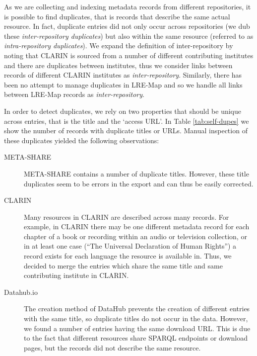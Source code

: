 \documentclass[11pt]{article}
\begin{document}
As we are collecting and indexing metadata records from different repositories,
it is possible to find duplicates, that is records that describe the same actual
resource.
In fact, duplicate entries did not only occur across repositories
(we dub these \emph{inter-repository duplicates}) but also within the same
resource (referred to as \emph{intra-repository duplicates}). 
We expand the
definition of inter-repository by noting that CLARIN 
is sourced from a number of different contributing institutes and there are
duplicates between institutes, thus we consider links between records
of different CLARIN institutes as \emph{inter-repository}. Similarly, there has
been no attempt to manage duplicates in LRE-Map and so we handle all links
between LRE-Map records as \emph{inter-repository}.

In order to detect duplicates, we rely on two properties
that should be unique across entries, that is the title and the `access URL'.
In Table
\ref{tab:self-dupes} we show the number of records with duplicate titles or URLs.
Manual inspection of these duplicates yielded the following
observations:

\begin{description}

	\item[META-SHARE] META-SHARE contains a number of duplicate titles.
            However, these title duplicates seem to be errors in the export and can thus be easily corrected. 

    \item[CLARIN] Many resources in CLARIN are described across many records.
        For example, in CLARIN there may be one different metadata record for each chapter of a book or
        recording within an audio or television collection, or in at least one case
        (``The Universal Declaration of Human Rights'') a record exists for each
        language the resource is available in. Thus, we decided to merge the entries which
        share the same title and same contributing institute in CLARIN.
        
    \item[Datahub.io] The creation method of DataHub prevents the creation of
        different entries with the same title, so duplicate titles do not occur
        in the data. However, we found a number of entries having the same
        download URL. This is due to the fact that different resources share
        SPARQL endpoints or download pages, but the records did not describe the
        same resource.
    
\end{description}
\end{document}
